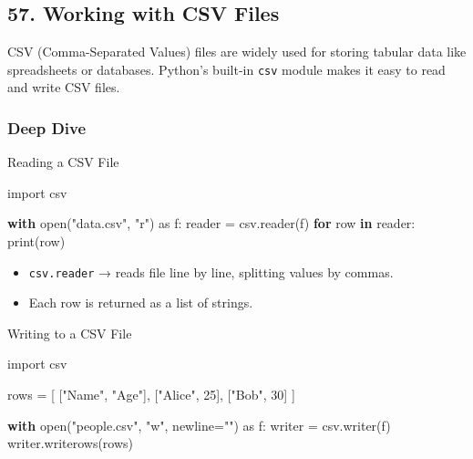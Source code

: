 \documentclass[
  letterpaper,
  DIV=11,
  numbers=noendperiod]{scrreprt}
\newenvironment{Shaded}{\begin{snugshade}}{\end{snugshade}}
\newcommand{\BuiltInTok}[1]{\textcolor[rgb]{0.00,0.23,0.31}{#1}}
\newcommand{\ControlFlowTok}[1]{\textcolor[rgb]{0.00,0.23,0.31}{\textbf{#1}}}
\newcommand{\DecValTok}[1]{\textcolor[rgb]{0.68,0.00,0.00}{#1}}
\newcommand{\ImportTok}[1]{\textcolor[rgb]{0.00,0.46,0.62}{#1}}
\newcommand{\KeywordTok}[1]{\textcolor[rgb]{0.00,0.23,0.31}{\textbf{#1}}}
\newcommand{\NormalTok}[1]{\textcolor[rgb]{0.00,0.23,0.31}{#1}}
\newcommand{\OperatorTok}[1]{\textcolor[rgb]{0.37,0.37,0.37}{#1}}
\newcommand{\StringTok}[1]{\textcolor[rgb]{0.13,0.47,0.30}{#1}}
\providecommand{\tightlist}{%
  \setlength{\itemsep}{0pt}\setlength{\parskip}{0pt}}
\begin{document}
\subsection{57. Working with CSV Files}\label{working-with-csv-files}

CSV (Comma-Separated Values) files are widely used for storing tabular
data like spreadsheets or databases. Python's built-in \texttt{csv}
module makes it easy to read and write CSV files.

\subsubsection{Deep Dive}\label{deep-dive-56}

Reading a CSV File

\begin{Shaded}
\begin{Highlighting}[]
\ImportTok{import}\NormalTok{ csv}

\ControlFlowTok{with} \BuiltInTok{open}\NormalTok{(}\StringTok{"data.csv"}\NormalTok{, }\StringTok{"r"}\NormalTok{) }\ImportTok{as}\NormalTok{ f:}
\NormalTok{    reader }\OperatorTok{=}\NormalTok{ csv.reader(f)}
    \ControlFlowTok{for}\NormalTok{ row }\KeywordTok{in}\NormalTok{ reader:}
        \BuiltInTok{print}\NormalTok{(row)}
\end{Highlighting}
\end{Shaded}

\begin{itemize}
\tightlist
\item
  \texttt{csv.reader} → reads file line by line, splitting values by
  commas.
\item
  Each row is returned as a list of strings.
\end{itemize}

Writing to a CSV File

\begin{Shaded}
\begin{Highlighting}[]
\ImportTok{import}\NormalTok{ csv}

\NormalTok{rows }\OperatorTok{=}\NormalTok{ [}
\NormalTok{    [}\StringTok{"Name"}\NormalTok{, }\StringTok{"Age"}\NormalTok{],}
\NormalTok{    [}\StringTok{"Alice"}\NormalTok{, }\DecValTok{25}\NormalTok{],}
\NormalTok{    [}\StringTok{"Bob"}\NormalTok{, }\DecValTok{30}\NormalTok{]}
\NormalTok{]}

\ControlFlowTok{with} \BuiltInTok{open}\NormalTok{(}\StringTok{"people.csv"}\NormalTok{, }\StringTok{"w"}\NormalTok{, newline}\OperatorTok{=}\StringTok{""}\NormalTok{) }\ImportTok{as}\NormalTok{ f:}
\NormalTok{    writer }\OperatorTok{=}\NormalTok{ csv.writer(f)}
\NormalTok{    writer.writerows(rows)}
\end{Highlighting}
\end{Shaded}
\end{document}
